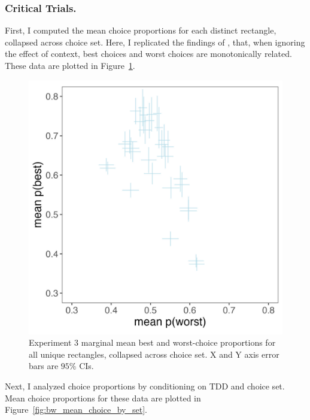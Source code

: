 \subsubsection{Critical Trials.}

First, I computed the mean choice proportions for each distinct rectangle, collapsed across choice set. Here, I replicated the findings of \textcite{hawkinsBestTimesWorst2014}, that, when ignoring the effect of context, best choices and worst choices are monotonically related. These data are plotted in Figure~\ref{fig:bw_marginal}.

\begin{figure}
   \includegraphics[width=\linewidth]{figures/crit_mean_props_marginal.jpeg}
   \caption{Experiment 3 marginal mean best and worst-choice proportions for all unique rectangles, collapsed across choice set. X and Y axis error bars are $95\%$ CIs.}
   \label{fig:bw_marginal}
\end{figure}

Next, I analyzed choice proportions by conditioning on TDD and choice set. Mean choice proportions for these data are plotted in Figure~\ref{fig:bw_mean_choice_by_set}. 

